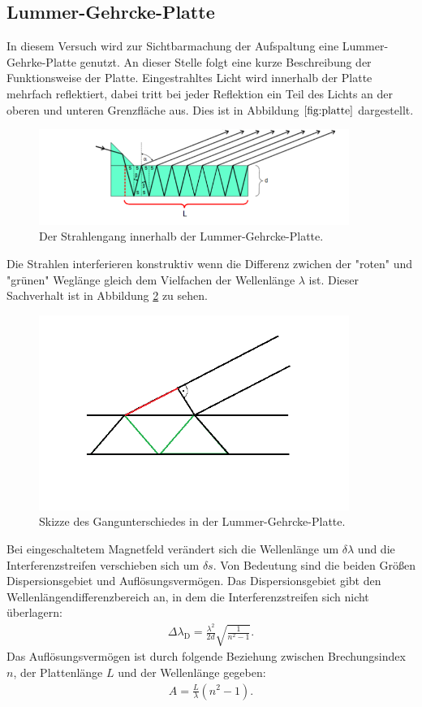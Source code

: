 \subsection{Lummer-Gehrcke-Platte}
In diesem Versuch wird zur Sichtbarmachung der Aufspaltung eine Lummer-Gehrke-Platte genutzt.
An dieser Stelle folgt eine kurze Beschreibung der Funktionsweise der Platte.
Eingestrahltes Licht wird innerhalb der Platte mehrfach reflektiert, dabei tritt bei
jeder Reflektion ein Teil des Lichts an der oberen und unteren Grenzfläche aus.
Dies ist in Abbildung $\ref{fig:platte}$ dargestellt.
\begin{figure}
   \centering
    \includegraphics[width=0.9\textwidth]{platte.PNG}
    \caption{Der Strahlengang innerhalb der Lummer-Gehrcke-Platte.\cite{skript}}
    \label{fig:platte}
\end{figure}
Die Strahlen interferieren konstruktiv wenn die Differenz zwichen der "roten" und "grünen"
Weglänge gleich dem Vielfachen der Wellenlänge $\lambda$ ist. Dieser Sachverhalt ist in
Abbildung \ref{fig:meisterwerk} zu sehen.
\begin{figure}
   \centering
    \includegraphics[width=0.9\textwidth]{meisterwerk.PNG}
    \caption{Skizze des Gangunterschiedes in der Lummer-Gehrcke-Platte.}
    \label{fig:meisterwerk}
\end{figure}
\FloatBarrier
Bei eingeschaltetem Magnetfeld verändert sich die Wellenlänge um $\delta\lambda$ und
die Interferenzstreifen verschieben sich um $\delta s$.
Von Bedeutung sind die beiden Größen Dispersionsgebiet und Auflösungsvermögen.
Das Dispersionsgebiet gibt den Wellenlängendifferenzbereich an, in dem die
Interferenzstreifen sich nicht überlagern:
\begin{align}
  \Delta\lambda_\mathrm{D}=\frac{\lambda^2}{2d}\sqrt{\frac{1}{n^2-1}} \label{eqn:dispersionsgebiet}.
\end{align}
Das Auflösungsvermögen ist durch folgende Beziehung zwischen Brechungsindex $n$,
der Plattenlänge $L$ und der Wellenlänge gegeben:
\begin{align}
  A=\frac{L}{\lambda}(n^2-1)\label{eqn:aufloesung}.
\end{align}
